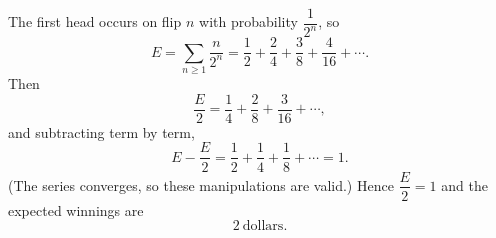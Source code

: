 The first head occurs on flip $n$ with probability $\dfrac{1}{2^n}$, so
\[
E=\sum_{n\ge1}\dfrac{n}{2^n}=\dfrac{1}{2}+\dfrac{2}{4}+\dfrac{3}{8}+\dfrac{4}{16}+\cdots.
\]
Then
\[
\dfrac{E}{2}=\dfrac{1}{4}+\dfrac{2}{8}+\dfrac{3}{16}+\cdots,
\]
and subtracting term by term,
\[
E-\dfrac{E}{2}=\dfrac{1}{2}+\dfrac{1}{4}+\dfrac{1}{8}+\cdots=1.
\]
(The series converges, so these manipulations are valid.) Hence $\dfrac{E}{2}=1$ and the expected winnings are
\[\boxed{2}\ \text{dollars}.\]
